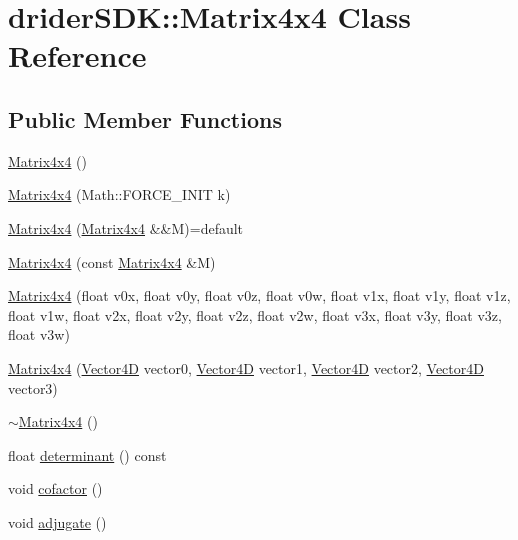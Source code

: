 \hypertarget{classdrider_s_d_k_1_1_matrix4x4}{}\section{drider\+S\+DK\+:\+:Matrix4x4 Class Reference}
\label{classdrider_s_d_k_1_1_matrix4x4}
\subsection*{Public Member Functions}
\begin{DoxyCompactItemize}
\item 
\hyperlink{classdrider_s_d_k_1_1_matrix4x4_a696c5b9c5a3ae92bec287ffea2bab475}{Matrix4x4} ()
\item 
\hyperlink{classdrider_s_d_k_1_1_matrix4x4_ab4488ccdabfe2ae9a23b71827ddb5dd0}{Matrix4x4} (Math\+::\+F\+O\+R\+C\+E\+\_\+\+I\+N\+IT k)
\item 
\hyperlink{classdrider_s_d_k_1_1_matrix4x4_a2aa83bb9dd8c644bc98c0fde7c77d171}{Matrix4x4} (\hyperlink{classdrider_s_d_k_1_1_matrix4x4}{Matrix4x4} \&\&M)=default
\item 
\hyperlink{classdrider_s_d_k_1_1_matrix4x4_ac266ab96b1bfc7596493518657347e21}{Matrix4x4} (const \hyperlink{classdrider_s_d_k_1_1_matrix4x4}{Matrix4x4} \&M)
\item 
\hyperlink{classdrider_s_d_k_1_1_matrix4x4_ac02c69c1208e330998c5f9273c210321}{Matrix4x4} (float v0x, float v0y, float v0z, float v0w, float v1x, float v1y, float v1z, float v1w, float v2x, float v2y, float v2z, float v2w, float v3x, float v3y, float v3z, float v3w)
\item 
\hyperlink{classdrider_s_d_k_1_1_matrix4x4_af45cb839de51a6ac04d1f0930c3b80b8}{Matrix4x4} (\hyperlink{classdrider_s_d_k_1_1_vector4_d}{Vector4D} vector0, \hyperlink{classdrider_s_d_k_1_1_vector4_d}{Vector4D} vector1, \hyperlink{classdrider_s_d_k_1_1_vector4_d}{Vector4D} vector2, \hyperlink{classdrider_s_d_k_1_1_vector4_d}{Vector4D} vector3)
\item 
\hyperlink{classdrider_s_d_k_1_1_matrix4x4_a4166cb8a25afb808ec7fe0035b401cbd}{$\sim$\+Matrix4x4} ()
\item 
float \hyperlink{classdrider_s_d_k_1_1_matrix4x4_a91d8bd9e3887c79f4d6ab78984a1139d}{determinant} () const
\item 
void \hyperlink{classdrider_s_d_k_1_1_matrix4x4_a4da17c3d74556ed7c15319bee90111d2}{cofactor} ()
\item 
void \hyperlink{classdrider_s_d_k_1_1_matrix4x4_af11d4d0c46eaca07f45f9facda94a3d7}{adjugate} ()

\end{DoxyCompactItemize}
